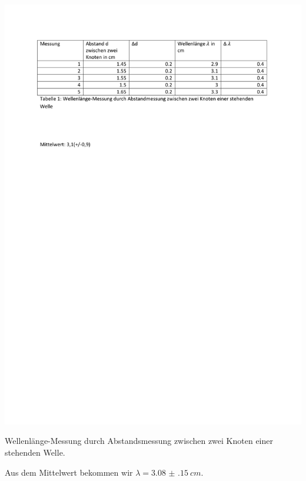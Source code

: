 \begin{table}[h]
\centering
\includegraphics[width=\linewidth, trim=2.2cm 23.2cm 2.2cm 2.3cm, clip=true]{res/Nr3.pdf}
\caption{Wellenlänge-Messung durch Abstandsmessung zwischen zwei Knoten einer stehenden Welle.}
\label{fig:wellenl}
\end{table}
Aus dem Mittelwert bekommen wir $\lambda=\SI{3.08(15)}{cm}$.

